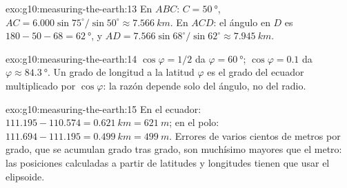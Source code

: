 \begin{solution}{exo:g10:measuring-the-earth:13}
En $ABC$: $C = \qty{50}{\degree}$, $AC = 6.000 \sin 75^\circ/\sin 50^\circ
\approx \qty{7.566}{km}$. En $ACD$: el ángulo en $D$ es $180 - 50 - 68 =
\qty{62}{\degree}$, y $AD = 7.566 \sin 68^\circ/\sin 62^\circ \approx
\qty{7.945}{km}$.
\end{solution}

\begin{solution}{exo:g10:measuring-the-earth:14}
$\cos\varphi = 1/2$ da $\varphi = \qty{60}{\degree}$; $\cos\varphi = 0.1$
da $\varphi \approx \qty{84.3}{\degree}$. Un grado de longitud a la latitud
$\varphi$ es el grado del ecuador multiplicado por $\cos\varphi$: la razón
depende solo del ángulo, no del radio.
\end{solution}

\begin{solution}{exo:g10:measuring-the-earth:15}
En el ecuador: $111.195 - 110.574 = \qty{0.621}{km} = \qty{621}{m}$; en el
polo: $111.694 - 111.195 = \qty{0.499}{km} = \qty{499}{m}$. Errores de varios
cientos de metros por grado, que se acumulan grado tras grado, son muchísimo
mayores que el metro: las posiciones calculadas a partir de latitudes y
longitudes tienen que usar el elipsoide.
\end{solution}

